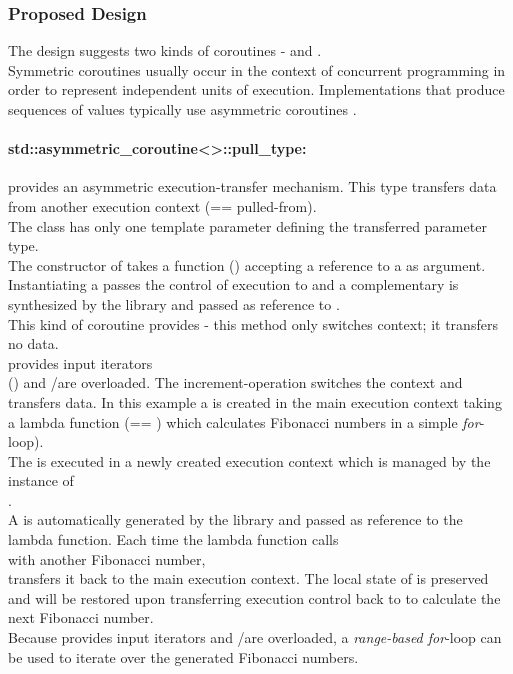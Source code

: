 
\subsubsection*{Proposed Design}
The design suggests two kinds of coroutines - \acoro and \scoro.\\
Symmetric coroutines usually occur in the context of concurrent programming in
order to represent independent units of execution. Implementations that produce
sequences of values typically use asymmetric coroutines \cite{Moura2009}.

\paragraph*{std::asymmetric\_coroutine<>::pull\_type:}
provides an asymmetric execution-transfer mechanism. This type transfers data
from another execution context (== pulled-from).\\
The class has only one template parameter defining the transferred parameter
type.\\
The constructor of \pullcoro takes a function (\corofunction) accepting a
reference to a \pushcoro as argument.\\
Instantiating a \pullcoro passes the control of execution to \corofunction and a
complementary \pushcoro is synthesized by the library and passed as reference to
\corofunction.\\
\newline
This kind of coroutine provides \pullcoroop - this method only switches context;
it transfers no data.\\
\newline
\pullcoro provides input iterators\\
(\pullcoroiterator) and \bgin/\ed are overloaded. The increment-operation
switches the context and transfers data.
In this example a \pullcoro is created in the main execution context taking a
lambda function (== \corofunction) which calculates Fibonacci numbers in a
simple \textit{for}-loop).\\
The \corofunction is executed in a newly created execution context which is
managed by the instance of\\
\pullcoro.\\
A \pushcoro is automatically generated by the library and passed as reference
to the lambda function. Each time the lambda function calls\\
\pushcoroop with another Fibonacci number,\\
\pushcoro transfers it back to the main execution context. The local state of
\corofunction is preserved and will be restored upon transferring execution
control back to \corofunction to calculate the next Fibonacci number.\\
Because \pullcoro provides input iterators and \bgin/\ed are overloaded, a
\textit{range-based for}-loop can be used to iterate over the generated
Fibonacci numbers.

